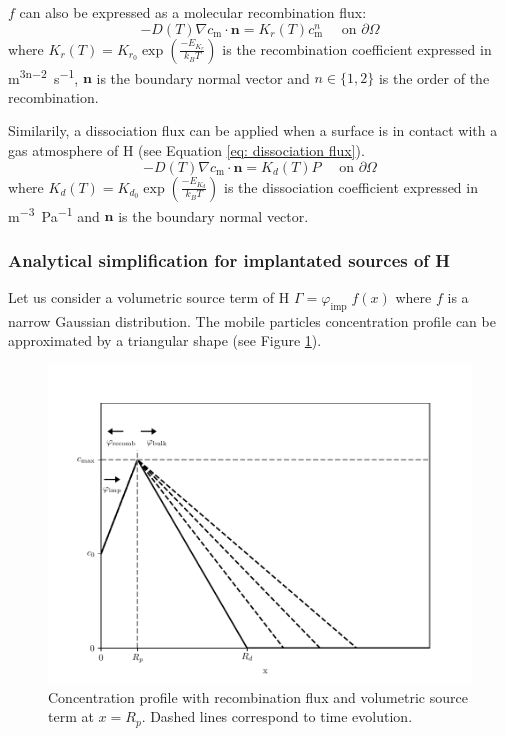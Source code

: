 $f$ can also be expressed as a molecular recombination flux:
\begin{equation}
    - D(T)\nabla c_\mathrm{m} \cdot \mathbf{n} = K_r(T) c_\mathrm{m}^n \quad \text { on } \partial \Omega
    \label{eq: recombination flux}
\end{equation}
where $K_r(T) = K_{r_0} \exp(\frac{-E_{K_r}}{k_B T}) $ is the recombination coefficient expressed in \si{m^{3n-2}.s^{-1}}, $\mathbf{n}$ is the boundary normal vector and $n \in \{1, 2\}$ is the order of the recombination.

Similarily, a dissociation flux can be applied when a surface is in contact with a gas atmosphere of H (see Equation \ref{eq: dissociation flux}).
\begin{equation}
    - D(T)\nabla c_\mathrm{m} \cdot \mathbf{n} = K_d(T) P \quad \text { on } \partial \Omega
    \label{eq: dissociation flux}
\end{equation}
where $K_d(T) = K_{d_0} \exp(\frac{-E_{K_d}}{k_B T}) $ is the dissociation coefficient expressed in \si{m^{-3}.Pa^{-1}} and $\mathbf{n}$ is the boundary normal vector.

\subsubsection{Analytical simplification for implantated sources of H}
Let us consider a volumetric source term of H $\Gamma = \varphi_\mathrm{imp} \; f(x)$ where $f$ is a narrow Gaussian distribution.
The mobile particles concentration profile can be approximated by a triangular shape  (see Figure \ref{fig:recomb sketch}).

\begin{figure}[h!]
    \centering
    \includegraphics[width=0.75\linewidth]{Figures/Chapter2/recomb_sketch.pdf}
    \caption{Concentration profile with recombination flux and volumetric source term at $x=R_p$. Dashed lines correspond to time evolution.}
    \label{fig:recomb sketch}
\end{figure}


